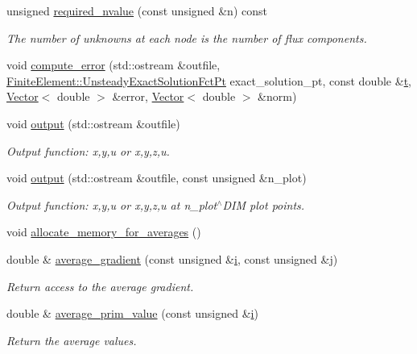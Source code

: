 \begin{DoxyCompactItemize}
unsigned \hyperlink{classoomph_1_1EulerEquations_a94116a7673c825ab36ed1d57f3cb8a62}{required\+\_\+nvalue} (const unsigned \&n) const
\begin{DoxyCompactList}\small\item\em The number of unknowns at each node is the number of flux components. \end{DoxyCompactList}\item 
void \hyperlink{classoomph_1_1EulerEquations_a3e277760413c4b27b3eae150b1d212b1}{compute\+\_\+error} (std\+::ostream \&outfile, \hyperlink{classoomph_1_1FiniteElement_ad4ecf2b61b158a4b4d351a60d23c633e}{Finite\+Element\+::\+Unsteady\+Exact\+Solution\+Fct\+Pt} exact\+\_\+solution\+\_\+pt, const double \&\hyperlink{cfortran_8h_af6f0bd3dc13317f895c91323c25c2b8f}{t}, \hyperlink{classoomph_1_1Vector}{Vector}$<$ double $>$ \&error, \hyperlink{classoomph_1_1Vector}{Vector}$<$ double $>$ \&norm)
\item 
void \hyperlink{classoomph_1_1EulerEquations_a4478d473edbda3529602c75f70cafe30}{output} (std\+::ostream \&outfile)
\begin{DoxyCompactList}\small\item\em Output function\+: x,y,u or x,y,z,u. \end{DoxyCompactList}\item 
void \hyperlink{classoomph_1_1EulerEquations_a9d51d5bcc096341b6f73353d87def5b3}{output} (std\+::ostream \&outfile, const unsigned \&n\+\_\+plot)
\begin{DoxyCompactList}\small\item\em Output function\+: x,y,u or x,y,z,u at n\+\_\+plot$^\wedge$\+D\+IM plot points. \end{DoxyCompactList}\item 
void \hyperlink{classoomph_1_1EulerEquations_aee507c1b94ee9a6bdfd77db410ca85e8}{allocate\+\_\+memory\+\_\+for\+\_\+averages} ()
\item 
double \& \hyperlink{classoomph_1_1EulerEquations_a0e83b231a00250adc6da3069b9936cc1}{average\+\_\+gradient} (const unsigned \&\hyperlink{cfortran_8h_adb50e893b86b3e55e751a42eab3cba82}{i}, const unsigned \&j)
\begin{DoxyCompactList}\small\item\em Return access to the average gradient. \end{DoxyCompactList}\item 
double \& \hyperlink{classoomph_1_1EulerEquations_adc564d7d1f93e710167b9aa8c089da0c}{average\+\_\+prim\+\_\+value} (const unsigned \&\hyperlink{cfortran_8h_adb50e893b86b3e55e751a42eab3cba82}{i})
\begin{DoxyCompactList}\small\item\em Return the average values. \end{DoxyCompactList}\end{DoxyCompactItemize}
